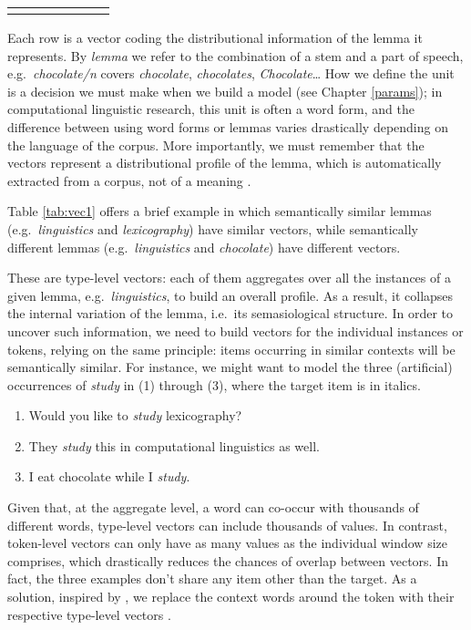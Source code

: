 \documentclass[
]{book}
\providecommand{\tightlist}{%
  \setlength{\itemsep}{0pt}\setlength{\parskip}{0pt}}
\begin{document}
\begin{longtable}[c]{|p{0.75in}|p{0.75in}|p{0.75in}|p{0.75in}|p{0.75in}|p{0.75in}|p{0.75in}}
\noalign{\global\setlength{\arrayrulewidth}{2pt}}\arrayrulecolor[HTML]{666666}\cline{1-7}

\end{longtable}

Each row is a vector coding the distributional information of the lemma it represents. By \emph{lemma} we refer to the combination of a stem and a part of speech, e.g.~\emph{chocolate/n} covers \emph{chocolate}, \emph{chocolates}, \emph{Chocolate}\ldots{} How we define the unit is a decision we must make when we build a model (see Chapter \ref{params}); in computational linguistic research, this unit is often a word form, and the difference between using word forms or lemmas varies drastically depending on the language of the corpus. More importantly, we must remember that the vectors represent a distributional profile of the lemma, which is automatically extracted from a corpus, not of a meaning \autocite[Cf.][ 82]{bolognesi_2020}.

Table \ref{tab:vec1} offers a brief example in which semantically similar lemmas (e.g.~\emph{linguistics} and \emph{lexicography}) have similar vectors, while semantically different lemmas (e.g.~\emph{linguistics} and \emph{chocolate}) have different vectors.

These are type-level vectors: each of them aggregates over all the instances of a given lemma, e.g.~\emph{linguistics}, to build an overall profile. As a result, it collapses the internal variation of the lemma, i.e.~its semasiological structure. In order to uncover such information, we need to build vectors for the individual instances or tokens, relying on the same principle: items occurring in similar contexts will be semantically similar. For instance, we might want to model the three (artificial) occurrences of \emph{study} in (1) through (3), where the target item is in italics.

\begin{enumerate}
\def\labelenumi{(\arabic{enumi})}
\tightlist
\item
  Would you like to \emph{study} lexicography?
\item
  They \emph{study} this in computational linguistics as well.
\item
  I eat chocolate while I \emph{study}.
\end{enumerate}

Given that, at the aggregate level, a word can co-occur with thousands of different words, type-level vectors can include thousands of values. In contrast, token-level vectors can only have as many values as the individual window size comprises, which drastically reduces the chances of overlap between vectors. In fact, the three examples don't share any item other than the target. As a solution, inspired by \textcite{schutze_1998}, we replace the context words around the token with their respective type-level vectors \autocite{heylen.etal_2015,depascale_2019}.
\end{document}
